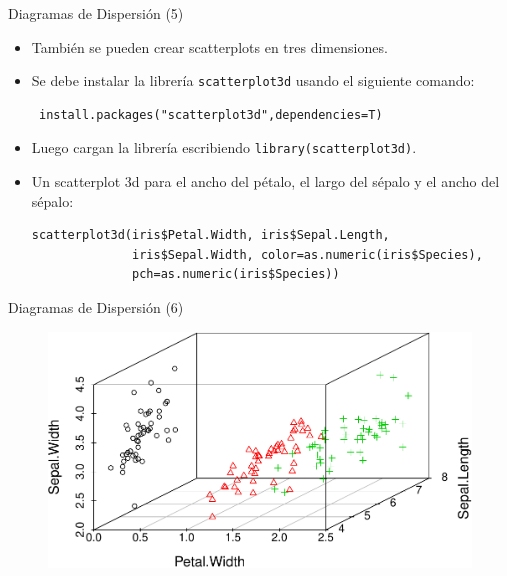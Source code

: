 \documentclass[handout]{beamer}
\begin{document}
\begin{frame}[fragile]{Diagramas de Dispersión (5)}
\scriptsize{
\begin{itemize}
 \item También se pueden crear scatterplots en tres dimensiones.
 \item Se debe instalar la librería \verb+scatterplot3d+ usando el siguiente comando:
 
 \begin{verbatim}
 install.packages("scatterplot3d",dependencies=T)
 \end{verbatim}
 
 \item Luego cargan la librería escribiendo \verb+library(scatterplot3d)+.
 
 \item Un scatterplot 3d para el ancho del pétalo, el largo del sépalo y el ancho del sépalo:
 \begin{verbatim}
scatterplot3d(iris$Petal.Width, iris$Sepal.Length, 
              iris$Sepal.Width, color=as.numeric(iris$Species),
              pch=as.numeric(iris$Species))  
 \end{verbatim}

 
  
\end{itemize}




}
 
\end{frame}


\begin{frame}[fragile]{Diagramas de Dispersión (6)}

 
 
  \begin{figure}[h!]
	\centering
	\includegraphics[scale=0.6]{pics/scatter3.pdf}		
\end{figure} 
 
 

 
\end{frame}
\end{document}
